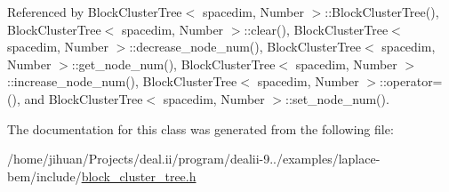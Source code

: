 Referenced by Block\+Cluster\+Tree$<$ spacedim, Number $>$\+::\+Block\+Cluster\+Tree(), Block\+Cluster\+Tree$<$ spacedim, Number $>$\+::clear(), Block\+Cluster\+Tree$<$ spacedim, Number $>$\+::decrease\+\_\+node\+\_\+num(), Block\+Cluster\+Tree$<$ spacedim, Number $>$\+::get\+\_\+node\+\_\+num(), Block\+Cluster\+Tree$<$ spacedim, Number $>$\+::increase\+\_\+node\+\_\+num(), Block\+Cluster\+Tree$<$ spacedim, Number $>$\+::operator=(), and Block\+Cluster\+Tree$<$ spacedim, Number $>$\+::set\+\_\+node\+\_\+num().



The documentation for this class was generated from the following file\+:\begin{DoxyCompactItemize}
\item 
/home/jihuan/\+Projects/deal.\+ii/program/dealii-\/9../examples/laplace-\/bem/include/\hyperlink{block__cluster__tree_8h}{block\+\_\+cluster\+\_\+tree.\+h}\end{DoxyCompactItemize}
